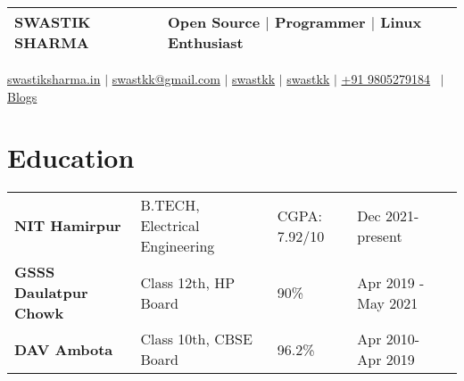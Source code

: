 \documentclass[legalpaper,11pt]{article}
\begin{document}
\pagestyle{empty} 



\begin{tabularx}{\linewidth}{@{} l X @{}}
\Huge{SWASTIK SHARMA} & \small{Open Source $|$ Programmer $|$ Linux Enthusiast} \\[6pt]
\hline %
\end{tabularx}

\begin{flushleft}
\href{https://www.swastiksharma.in}{\raisebox{-0.05\height}{\faGlobe} swastiksharma.in} $|$ 
\href{mailto:swastkk@gmail.com}{\raisebox{-0.05\height}{\faEnvelope} swastkk@gmail.com} $|$ 
\href{https://github.com/swastkk}{\raisebox{-0.05\height}{\faGithub} swastkk} $|$ 
\href{https://linkedin.com/in/swastkk}{\raisebox{-0.05\height}{\faLinkedin} swastkk} $|$ 
\href{tel:+919805279184}{\raisebox{-0.05\height}{\faMobile} +91 9805279184}
\ $|$ \
\href{https://blog.swastiksharma.in/}{\raisebox{-0.05\height} Blogs {\faBlog} }
\end{flushleft}

\section{Education}

\begin{tabular}{lllll}
\textbf{NIT Hamirpur}         & B.TECH, Electrical Engineering & CGPA: 7.92/10 & Dec 2021- present   &  \\
\textbf{GSSS Daulatpur Chowk} & Class 12th, HP Board           & 90\%          & Apr 2019 - May 2021 &  \\
\textbf{DAV Ambota}           & Class 10th, CBSE Board         & 96.2\%        & Apr 2010- Apr 2019  &  \\
                                  
\end{tabular}
\end{document}
